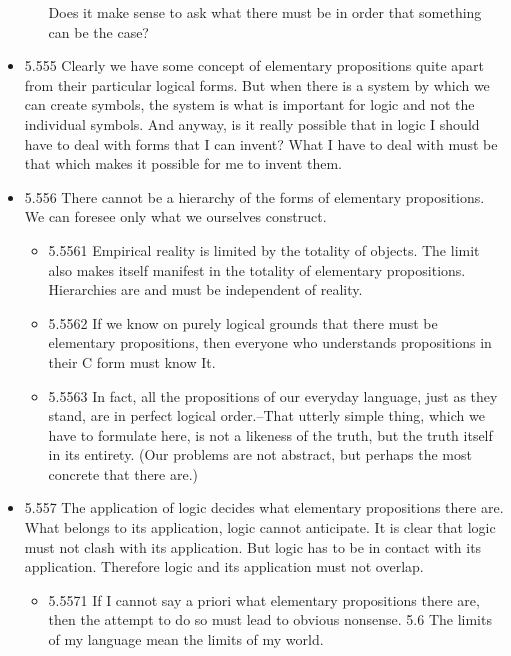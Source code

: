 \documentclass[11pt]{article}
\begin{document}
\begin{itemize}
\begin{itemize}
Does it make sense to ask what there must be in order that something can be
the case?
\end{itemize}
\item 5.555
\label{sec:org6871bc3}
Clearly we have some concept of elementary propositions quite apart
from their particular logical forms. But when there is a system by which we
can create symbols, the system is what is important for logic and not the
individual symbols. And anyway, is it really possible that in logic I
should have to deal with forms that I can invent? What I have to deal with
must be that which makes it possible for me to invent them.
\item 5.556
\label{sec:org5124622}
There cannot be a hierarchy of the forms of elementary propositions.
We can foresee only what we ourselves construct.
\begin{itemize}
\item 5.5561
\label{sec:org7afad84}
Empirical reality is limited by the totality of objects. The limit
also makes itself manifest in the totality of elementary propositions.
Hierarchies are and must be independent of reality.
\item 5.5562
\label{sec:orga1b5aa3}
If we know on purely logical grounds that there must be elementary
propositions, then everyone who understands propositions in their C form
must know It.
\item 5.5563
\label{sec:orgd869fd2}
In fact, all the propositions of our everyday language, just as they
stand, are in perfect logical order.--That utterly simple thing, which we
have to formulate here, is not a likeness of the truth, but the truth
itself in its entirety. (Our problems are not abstract, but perhaps the
most concrete that there are.)
\end{itemize}
\item 5.557
\label{sec:org0f87028}
The application of logic decides what elementary propositions there
are. What belongs to its application, logic cannot anticipate. It is clear
that logic must not clash with its application. But logic has to be in
contact with its application. Therefore logic and its application must not
overlap.
\begin{itemize}
\item 5.5571
\label{sec:org7c8cbbc}
If I cannot say a priori what elementary propositions there are,
then the attempt to do so must lead to obvious nonsense. 5.6 The limits of
my language mean the limits of my world.
\end{itemize}
\end{itemize}
\end{document}
